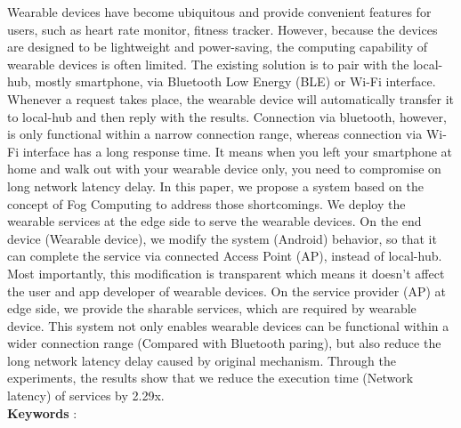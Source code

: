 \begin{Abstract_E}

Wearable devices have become ubiquitous and provide convenient features for users, 
such as heart rate monitor, fitness tracker.
However, because the devices are designed to be lightweight and power-saving,
the computing capability of wearable devices is often limited. 
The existing solution is to pair with the local-hub, mostly smartphone, via Bluetooth Low Energy (BLE) or Wi-Fi interface.
Whenever a request takes place, 
the wearable device will automatically transfer it to local-hub and then reply with the results.
Connection via bluetooth, however, is only functional within a narrow connection range, 
whereas connection via Wi-Fi interface has a long response time. 
It means when you left your smartphone at home and walk out with your wearable device only, 
you need to compromise on long network latency delay. 
In this paper, we propose a system based on the concept of Fog Computing to address those shortcomings. 
We deploy the wearable services at the edge side to serve the wearable devices.
On the end device (Wearable device), we modify the system (Android) behavior, 
so that it can complete the service via connected Access Point (AP), instead of local-hub.
Most importantly, this modification is transparent which means it doesn't affect the user and app developer of wearable devices.
On the service provider (AP) at edge side, we provide the sharable services, which are required by wearable device.
This system not only enables wearable devices can be functional within a wider connection range (Compared with Bluetooth paring), 
but also reduce the long network latency delay caused by original mechanism.
Through the experiments, the results show that we reduce the execution time (Network latency) of services by 2.29x. \\

{\bf Keywords} : 

\end{Abstract_E}
